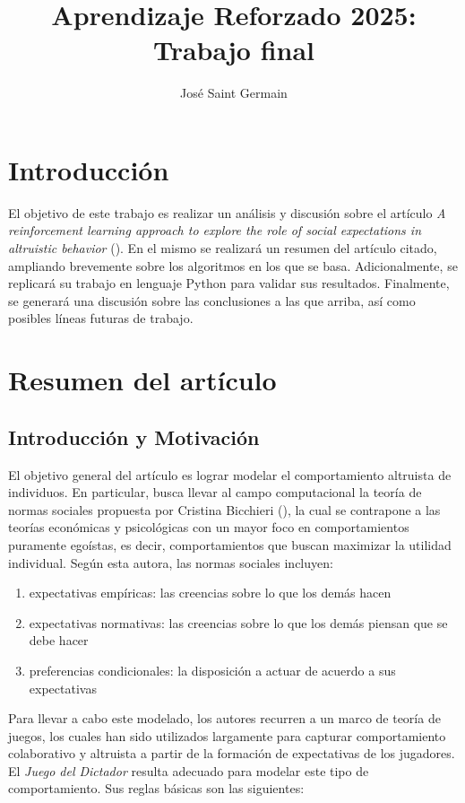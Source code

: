 \documentclass[12pt,a4paper]{article}
\title{Aprendizaje Reforzado 2025: Trabajo final}
\author{José Saint Germain}
\begin{document}
\maketitle

\section{Introducción}

El objetivo de este trabajo es realizar un análisis y discusión sobre el artículo 
\textit{A reinforcement learning approach to explore the role of social expectations in 
altruistic behavior} (\cite{castanon2023reinforcement}). En el mismo se realizará un resumen 
del artículo citado, ampliando brevemente sobre los algoritmos en los que se basa. Adicionalmente, 
se replicará su trabajo en lenguaje Python para validar sus resultados. Finalmente, se generará una 
discusión sobre las conclusiones a las que arriba, así como posibles líneas futuras de trabajo.

\section{Resumen del artículo}

\subsection{Introducción y Motivación}

El objetivo general del artículo es lograr modelar el comportamiento altruista de individuos. 
En particular, busca llevar al campo computacional la teoría de normas sociales propuesta por 
Cristina Bicchieri (\citeyear{bichieri2006}), la cual se contrapone a las teorías económicas y 
psicológicas con un mayor foco en comportamientos puramente egoístas, es decir, 
comportamientos que buscan maximizar la utilidad individual. Según esta autora, las normas 
sociales incluyen:

\begin{enumerate}
\item expectativas empíricas: las creencias sobre lo que los demás hacen
\item expectativas normativas: las creencias sobre lo que los demás piensan que se debe hacer
\item preferencias condicionales: la disposición a actuar de acuerdo a sus expectativas
\end{enumerate}

Para llevar a cabo este modelado, los autores recurren a un marco de teoría de juegos, los cuales han 
sido utilizados largamente para capturar comportamiento colaborativo y altruista a 
partir de la formación de expectativas de los jugadores. El \textit{Juego del Dictador} resulta 
adecuado para modelar este tipo de comportamiento. Sus reglas básicas son las siguientes:
\end{document}

